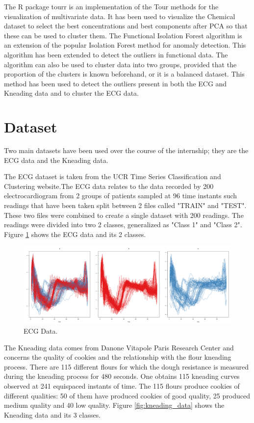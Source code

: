 \documentclass[]{article}
\begin{document}
The R package tourr is an implementation of the Tour methods for the visualization of multivariate data. It has been used to visualize the Chemical dataset to select the best concentrations and best components after PCA so that these can be used to cluster them. The Functional Isolation Forest algorithm is an extension of the popular Isolation Forest method for anomaly detection. This algorithm has been extended to detect the outliers in functional data. The algorithm can also be used to cluster data into two groups, provided that the proportion of the clusters is known beforehand, or it is a balanced dataset. This method has been used to detect the outliers present in both the ECG and Kneading data and to cluster the ECG data.



\section{Dataset}
Two main datasets have been used over the course of the internship; they are the ECG data and the Kneading data.

The ECG dataset is taken from the UCR Time Series Classiﬁcation and Clustering website.The ECG data relates to the data recorded by 200 electrocardiogram from 2 groups of patients sampled at 96 time instants such readings that have been taken split between 2 files called "TRAIN" and "TEST". These two files were combined to create a single dataset with 200 readings. The readings were divided into two 2 classes, generalized as "Class 1" and "Class 2". Figure \ref{fig:ecg_data} shows the ECG data and its 2 classes.

\begin{figure}
	\includegraphics[width=\linewidth]{ecg_data.png}
	\caption{ECG Data.}
	\label{fig:ecg_data}
\end{figure}

The Kneading data comes from Danone Vitapole Paris Research Center and concerns the quality of cookies and the relationship with the ﬂour kneading process. There are 115 different ﬂours for which the dough resistance is measured during the kneading process for 480 seconds. One obtains 115 kneading curves observed at 241 equispaced instants of time. The 115 ﬂours produce cookies of different qualities: 50 of them have produced cookies of good quality, 25 produced medium quality and 40 low quality. Figure \ref{fig:kneading_data} shows the Kneading data and its 3 classes.
\end{document}
